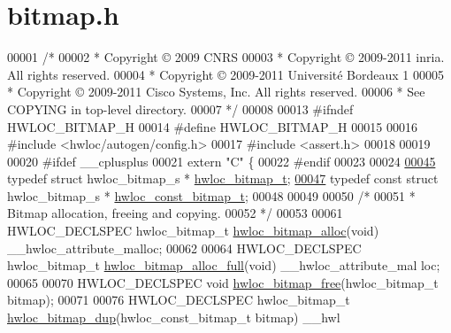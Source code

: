 \hypertarget{a00027_source}{
\section{bitmap.h}
}

\begin{DoxyCode}
00001 \textcolor{comment}{/*}
00002 \textcolor{comment}{ * Copyright © 2009 CNRS}
00003 \textcolor{comment}{ * Copyright © 2009-2011 inria.  All rights reserved.}
00004 \textcolor{comment}{ * Copyright © 2009-2011 Université Bordeaux 1}
00005 \textcolor{comment}{ * Copyright © 2009-2011 Cisco Systems, Inc.  All rights reserved.}
00006 \textcolor{comment}{ * See COPYING in top-level directory.}
00007 \textcolor{comment}{ */}
00008 
00013 \textcolor{preprocessor}{#ifndef HWLOC\_BITMAP\_H}
00014 \textcolor{preprocessor}{}\textcolor{preprocessor}{#define HWLOC\_BITMAP\_H}
00015 \textcolor{preprocessor}{}
00016 \textcolor{preprocessor}{#include <hwloc/autogen/config.h>}
00017 \textcolor{preprocessor}{#include <assert.h>}
00018 
00019 
00020 \textcolor{preprocessor}{#ifdef \_\_cplusplus}
00021 \textcolor{preprocessor}{}\textcolor{keyword}{extern} \textcolor{stringliteral}{"C"} \{
00022 \textcolor{preprocessor}{#endif}
00023 \textcolor{preprocessor}{}
00024 
\hypertarget{a00027_source_l00045}{}\hyperlink{a00065_gaa3c2bf4c776d603dcebbb61b0c923d84}{00045} \textcolor{keyword}{typedef} \textcolor{keyword}{struct }hwloc\_bitmap\_s * \hyperlink{a00065_gaa3c2bf4c776d603dcebbb61b0c923d84}{hwloc_bitmap_t};
\hypertarget{a00027_source_l00047}{}\hyperlink{a00065_ga2fb1bbc8aea1ea22dee2f0fd39659f48}{00047} \textcolor{keyword}{typedef} \textcolor{keyword}{const} \textcolor{keyword}{struct }hwloc\_bitmap\_s * \hyperlink{a00065_ga2fb1bbc8aea1ea22dee2f0fd39659f48}{hwloc_const_bitmap_t};
00048 
00049 
00050 \textcolor{comment}{/*}
00051 \textcolor{comment}{ * Bitmap allocation, freeing and copying.}
00052 \textcolor{comment}{ */}
00053 
00061 HWLOC\_DECLSPEC hwloc\_bitmap\_t \hyperlink{a00065_ga9fb6aedc30d4ef4998fa53e2403b6130}{hwloc_bitmap_alloc}(\textcolor{keywordtype}{void}) \_\_hwloc\_attribute\_malloc;
00062 
00064 HWLOC\_DECLSPEC hwloc\_bitmap\_t \hyperlink{a00065_gadd4479485685bda179f4b8b9b70f671e}{hwloc_bitmap_alloc_full}(\textcolor{keywordtype}{void}) \_\_hwloc\_attribute\_mal
      loc;
00065 
00070 HWLOC\_DECLSPEC \textcolor{keywordtype}{void} \hyperlink{a00065_ga8e7035fe555ef96921bfb98e08519bc7}{hwloc_bitmap_free}(hwloc\_bitmap\_t bitmap);
00071 
00076 HWLOC\_DECLSPEC hwloc\_bitmap\_t \hyperlink{a00065_gaaa4ed76211cd3694dfbea2109fc440be}{hwloc_bitmap_dup}(hwloc\_const\_bitmap\_t bitmap) \_\_hwl

\end{DoxyCode}
